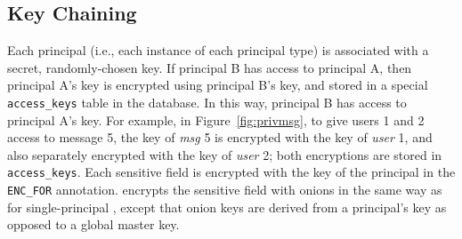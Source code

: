 



\subsection{Key Chaining}
\label{ss:keychain}

Each principal (i.e., each instance of each principal type) is associated
with a secret, randomly-chosen key.  If principal B has access to
principal A, then principal A's key is encrypted using principal B's
key, and stored in a special \texttt{access\_keys} table in the database.
In this way, principal B has access to principal A's key.  For example,
in Figure~\ref{fig:privmsg}, to give users 1 and 2 access to message 5,
the key of {\em msg} 5 is encrypted with the key of {\em user} 1, and
also separately encrypted with the key of {\em user} 2; both encryptions
are stored in \texttt{access\_keys}.  Each sensitive
field is encrypted with the key of the principal in the {\small \tt
ENC\_FOR} annotation. \name{} encrypts the sensitive field with
onions in the same way as for single-principal \name,
except that onion keys are derived from a principal's key as opposed to
a global master key.

